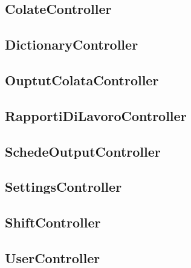  \subsection{ColateController}
  \subsection{DictionaryController}
  \subsection{OuptutColataController}
  \subsection{RapportiDiLavoroController}
  \subsection{SchedeOutputController}
  \subsection{SettingsController}
  \subsection{ShiftController}
  \subsection{UserController}
